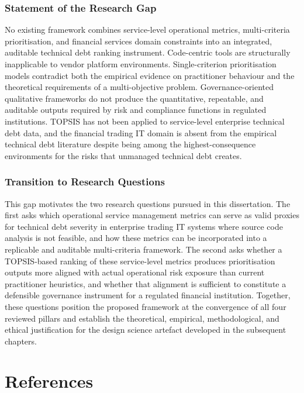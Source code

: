 \documentclass[
  british,
  12pt,
  a4paper,
]{report}
\begin{document}
\subsection{Statement of the Research
Gap}\label{statement-of-the-research-gap}

No existing framework combines service-level operational metrics,
multi-criteria prioritisation, and financial services domain constraints
into an integrated, auditable technical debt ranking instrument.
Code-centric tools are structurally inapplicable to vendor platform
environments. Single-criterion prioritisation models contradict both the
empirical evidence on practitioner behaviour and the theoretical
requirements of a multi-objective problem. Governance-oriented
qualitative frameworks do not produce the quantitative, repeatable, and
auditable outputs required by risk and compliance functions in regulated
institutions. TOPSIS has not been applied to service-level enterprise
technical debt data, and the financial trading IT domain is absent from
the empirical technical debt literature despite being among the
highest-consequence environments for the risks that unmanaged technical
debt creates.

\subsection{Transition to Research
Questions}\label{transition-to-research-questions}

This gap motivates the two research questions pursued in this
dissertation. The first asks which operational service management
metrics can serve as valid proxies for technical debt severity in
enterprise trading IT systems where source code analysis is not
feasible, and how these metrics can be incorporated into a replicable
and auditable multi-criteria framework. The second asks whether a
TOPSIS-based ranking of these service-level metrics produces
prioritisation outputs more aligned with actual operational risk
exposure than current practitioner heuristics, and whether that
alignment is sufficient to constitute a defensible governance instrument
for a regulated financial institution. Together, these questions
position the proposed framework at the convergence of all four reviewed
pillars and establish the theoretical, empirical, methodological, and
ethical justification for the design science artefact developed in the
subsequent chapters.


\chapter*{References}\label{references}
\end{document}
